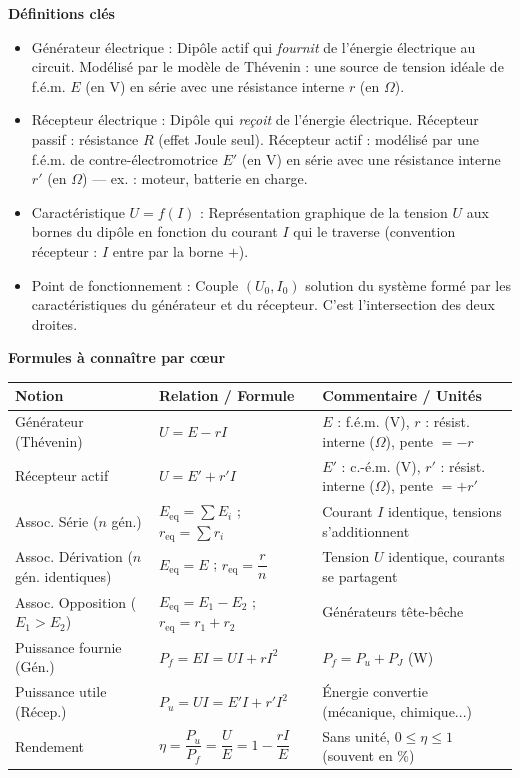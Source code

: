 \documentclass[11pt]{article}
\newcommand{\cle}[1]{{\popxbold\color{popdark}#1}}
\begin{document}
\begin{bilan}

\textbf{Définitions clés}
\begin{itemize}
    \item \cle{Générateur électrique} : Dipôle actif qui \emph{fournit} de l'énergie électrique au circuit. Modélisé par le \cle{modèle de Thévenin} : une source de tension idéale de f.é.m. $E$ (en V) en série avec une résistance interne $r$ (en $\Omega$).
    \item \cle{Récepteur électrique} : Dipôle qui \emph{reçoit} de l'énergie électrique. \cle{Récepteur passif} : résistance $R$ (effet Joule seul). \cle{Récepteur actif} : modélisé par une f.é.m. de contre-électromotrice $E'$ (en V) en série avec une résistance interne $r'$ (en $\Omega$) — ex. : moteur, batterie en charge.
    \item \cle{Caractéristique $U=f(I)$} : Représentation graphique de la tension $U$ aux bornes du dipôle en fonction du courant $I$ qui le traverse (convention récepteur : $I$ entre par la borne $+$).
    \item \cle{Point de fonctionnement} : Couple $(U_0, I_0)$ solution du système formé par les caractéristiques du générateur et du récepteur. C'est l'intersection des deux droites.
\end{itemize}

\textbf{Formules à connaître par cœur}
\begin{center}
\begin{tabularx}{\linewidth}{|l|X|l|}\hline
\rowcolor{popblueL}
\textbf{Notion} & \textbf{Relation / Formule} & \textbf{Commentaire / Unités} \\ \hline
Générateur (Thévenin) & $U = E - r I$ & $E$ : f.é.m. (V), $r$ : résist. interne ($\Omega$), pente $=-r$ \\ \hline
Récepteur actif & $U = E' + r' I$ & $E'$ : c.-é.m. (V), $r'$ : résist. interne ($\Omega$), pente $=+r'$ \\ \hline
Assoc. Série ($n$ gén.) & $E_{\text{eq}} = \sum E_i$ ; $r_{\text{eq}} = \sum r_i$ & Courant $I$ identique, tensions s'additionnent \\ \hline
Assoc. Dérivation ($n$ gén. identiques) & $E_{\text{eq}} = E$ ; $r_{\text{eq}} = \dfrac{r}{n}$ & Tension $U$ identique, courants se partagent \\ \hline
Assoc. Opposition ($E_1 > E_2$) & $E_{\text{eq}} = E_1 - E_2$ ; $r_{\text{eq}} = r_1 + r_2$ & Générateurs tête-bêche \\ \hline
Puissance fournie (Gén.) & $P_f = E I = U I + r I^2$ & $P_f = P_u + P_J$ (W) \\ \hline
Puissance utile (Récep.) & $P_u = U I = E' I + r' I^2$ & Énergie convertie (mécanique, chimique...) \\ \hline
Rendement & $\eta = \dfrac{P_u}{P_f} = \dfrac{U}{E} = 1 - \dfrac{r I}{E}$ & Sans unité, $0 \le \eta \le 1$ (souvent en \%) \\ \hline
\end{tabularx}
\end{center}


\end{bilan}
\end{document}
